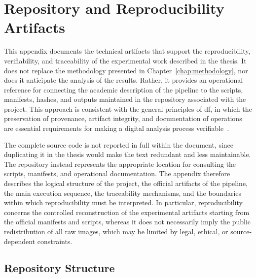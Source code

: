 \chapter{Repository and Reproducibility Artifacts}
\label{app:repository-reproducibility-artifacts}

This appendix documents the technical artifacts that support the reproducibility,
verifiability, and traceability of the experimental work described in the
thesis. It does not replace the methodology presented in
Chapter~\ref{chap:methodology}, nor does it anticipate the analysis of the
results. Rather, it provides an operational reference for connecting the
academic description of the pipeline to the scripts, manifests, hashes, and
outputs maintained in the repository associated with the project. This approach
is consistent with the general principles of \gls{df}, in which the
preservation of provenance, artifact integrity, and documentation of operations
are essential requirements for making a digital analysis process
verifiable~\cite{casey2011digital,garfinkel2010digital,nist2006guide,iso27037}.

The complete source code is not reported in full within the document, since
duplicating it in the thesis would make the text redundant and less
maintainable. The repository instead represents the appropriate location for
consulting the scripts, manifests, and operational documentation. The appendix
therefore describes the logical structure of the project, the official artifacts
of the pipeline, the main execution sequence, the traceability mechanisms, and
the boundaries within which reproducibility must be interpreted. In particular,
reproducibility concerns the controlled reconstruction of the experimental
artifacts starting from the official manifests and scripts, whereas it does not
necessarily imply the public redistribution of all raw images, which may be
limited by legal, ethical, or source-dependent constraints.


\section{Repository Structure}
\label{app:repository-structure}

